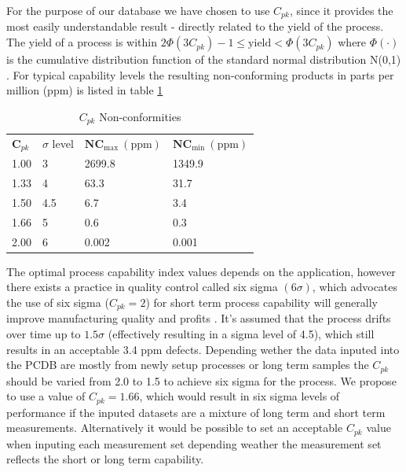 \documentclass[aip,amsmath, reprint, author-year]{revtex4-1}
\begin{document}
For the purpose of our database we have chosen to use $C_{pk}$, since it provides the most easily understandable result - directly related to the yield of the process. The yield of a process is within $2\Phi(3C_{pk})-1 \leq \text{yield} < \Phi(3C_{pk})$ where $\Phi(\cdot)$ is the cumulative distribution function of the standard normal distribution N(0,1) \citep{boyles1991taguchi}. For typical capability levels the resulting non-conforming products in parts per million (ppm) is listed in table \ref{tab:cpl_nc}

\begin{table}
\begin{ruledtabular}
\caption{\label{tab:cpl_nc} $C_{pk}$ Non-conformities}
\begin{tabular}{llll}
  $\mathbf{C}_{pk}$	& $\sigma$ level	& $\mathbf{NC_\mathrm{max}} \mathrm{\ (ppm)}$	&  $\mathbf{NC_\mathrm{min}} \mathrm{\ (ppm)}$	\\
  1.00	& 3		& 2699.8		& 1349.9		\\
  1.33 	& 4 		& 63.3		& 31.7 		\\
  1.50 	& 4.5 	& 6.7		& 3.4		\\
  1.66	& 5		& 0.6		& 0.3		\\
  2.00	& 6		& 0.002		& 0.001		\\
\end{tabular}%
\end{ruledtabular}
\end{table}

The optimal process capability index values depends on the application, however there exists a practice in quality control called six sigma $(6 \sigma)$, which advocates the use of six sigma ($C_{pk} = 2$) for short term process capability will generally improve manufacturing quality and profits \cite{koch2004design}. 
It's assumed that the process drifts over time up to $1.5 \sigma$ (effectively resulting in a sigma level of 4.5), which still results in an acceptable 3.4 ppm defects. 
Depending wether the data inputed into the PCDB are mostly from newly setup processes or long term samples the $C_{pk}$ should be varied from 2.0 to 1.5 to achieve six sigma for the process. 
We propose to use a value of $C_{pk} = 1.66$, which would result in six sigma levels of performance if the inputed datasets are a mixture of long term and short term measurements. 
Alternatively it would be possible to set an acceptable $C_{pk}$ value when inputing each measurement set depending weather the measurement set reflects the short or long term capability. 
\end{document}
